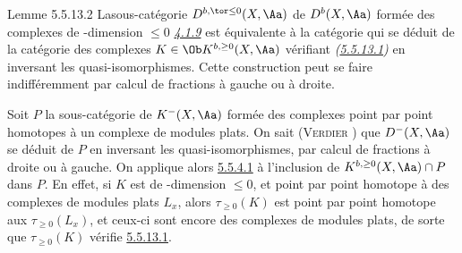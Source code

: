\documentclass[10pt]{../fichiers-configuration-latex/smfart}
\begin{document}
\begin{enonce*}{Lemme 5.5.13.2}
La\pageoriginale sous-catégorie $D^{b,\tor\leq 0}(X,\Aa)$ de
$D^{b}(X,\Aa)$ formée des complexes de \tTor-dimension $\leq 0$ \emph{\hyperref[XVII.def4.1.9]{4.1.9}}
est équivalente à la catégorie qui se déduit de la catégorie des
complexes $K\in \Ob K^{b,\geq 0}(X,\Aa)$ vérifiant
\emph{(\hyperref[XVII.par5.5.13.1]{5.5.13.1})} en inversant les quasi-isomorphismes. Cette
construction peut se faire indifféremment par calcul de fractions à gauche ou à droite.
\end{enonce*}

Soit $P$ la sous-catégorie de $K^{-}(X,\Aa)$ formée des
complexes point par point homotopes à un complexe de modules plats. On
sait (\textsc{Verdier} ) que $D^{-}(X,\Aa)$ se déduit de $P$ en
inversant les quasi-isomorphismes, par calcul de fractions à droite ou
à gauche. On applique alors \hyperref[XVII.lem5.5.4.1]{5.5.4.1} à l'inclusion de $K^{b,\geq
0}(X,\Aa)\cap P$ dans $P$. En effet, si $K$ est de
\tTor-dimension $\leq 0$, et point par point homotope à des complexes de
modules plats $L_{x}$, alors $\tau_{\geq 0}(K)$ est point par point
homotope aux $\tau_{\geq 0}(L_{x})$, et ceux-ci sont encore des
complexes de modules plats, de sorte que $\tau_{\geq 0}(K)$ vérifie
\hyperref[XVII.par5.5.13.1]{5.5.13.1}.
\end{document}
